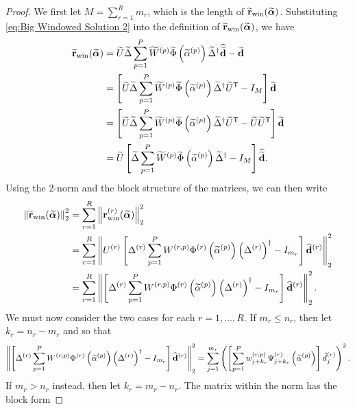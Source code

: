 \documentclass[12pt]{article}
\begin{document}
\begin{proof}
We first let $M = \sum_{r=1}^{R} m_r$, which is the length of $\widetilde{\mathbf{r}}_{\text{win}}(\widetilde{\bm{\alpha}})$. Substituting \eqref{eq:Big Windowed Solution 2} into the definition of $\widetilde{\mathbf{r}}_{\text{win}}(\widetilde{\bm{\alpha}})$, we have
\begin{align*}
    \widetilde{\mathbf{r}}_{\text{win}}(\widetilde{\bm{\alpha}}) &= \widetilde{U}\widetilde{\Delta}\sum_{p=1}^{P} \widetilde{W}^{(p)}\widetilde{\Phi}\left(\widetilde{\alpha}^{(p)}\right){\widetilde{\Delta}}^\dagger\widehat{\widetilde{\mathbf{d}}} - \widetilde{\mathbf{d}} \\
    &= \left[\widetilde{U}\widetilde{\Delta}\sum_{p=1}^{P} \widetilde{W}^{(p)}\widetilde{\Phi}\left(\widetilde{\alpha}^{(p)}\right){\widetilde{\Delta}}^\dagger{\widetilde{U}}^\mathsf{T} - I_M\right]\widetilde{\mathbf{d}} \\
    &= \left[\widetilde{U}\widetilde{\Delta}\sum_{p=1}^{P} \widetilde{W}^{(p)}\widetilde{\Phi}\left(\widetilde{\alpha}^{(p)}\right){\widetilde{\Delta}}^\dagger{\widetilde{U}}^\mathsf{T} - \widetilde{U}{\widetilde{U}}^\mathsf{T}\right]\widetilde{\mathbf{d}} \\
    &= \widetilde{U}\left[\widetilde{\Delta}\sum_{p=1}^{P} \widetilde{W}^{(p)}\widetilde{\Phi}\left(\widetilde{\alpha}^{(p)}\right){\widetilde{\Delta}}^\dagger - I_M\right]\widehat{\widetilde{\mathbf{d}}}.
\end{align*}
Using the 2-norm and the block structure of the matrices, we can then write
\begin{align*}
    \left\|\widetilde{\mathbf{r}}_{\text{win}}(\widetilde{\bm{\alpha}})\right\|_2^2 &= \sum_{r=1}^{R}\left\|\mathbf{r}_{\text{win}}^{(r)}(\widetilde{\bm{\alpha}})\right\|_2^2 \\
    &= \sum_{r=1}^{R} \left\|U^{(r)}\left[\Delta^{(r)}\sum_{p=1}^{P} W^{(r,p)}\Phi^{(r)}\left(\widetilde{\alpha}^{(p)}\right){\left(\Delta^{(r)}\right)}^\dagger - I_{m_r}\right]\widehat{\mathbf{d}}^{(r)}\right\|_2^2 \\
    &= \sum_{r=1}^{R} \left\|\left[\Delta^{(r)}\sum_{p=1}^{P} W^{(r,p)}\Phi^{(r)}\left(\widetilde{\alpha}^{(p)}\right){\left(\Delta^{(r)}\right)}^\dagger - I_{m_r}\right]\widehat{\mathbf{d}}^{(r)}\right\|_2^2.
\end{align*}
We must now consider the two cases for each $r = 1,\ldots,R$. If $m_r \leq n_r$, then let $k_r = n_r - m_r$ and so that 
\[\left\|\left[\Delta^{(r)}\sum_{p=1}^{P} W^{(r,p)}\Phi^{(r)}\left(\widetilde{\alpha}^{(p)}\right){\left(\Delta^{(r)}\right)}^\dagger - I_{m_r}\right]\widehat{\mathbf{d}}^{(r)}\right\|_2^2 = \sum_{j=1}^{m_r} \left(\left[\sum_{p=1}^{P} w_{j+{k_r}}^{(r,p)}\Psi_{j+{k_r}}^{(r)}\left(\widetilde{\alpha}^{(p)}\right)\right] \hat{d}_j^{(r)}\right)^2.\]
If $m_r > n_r$ instead, then let $k_r = m_r - n_r$. The matrix within the norm has the block form

\end{proof}
\end{document}

